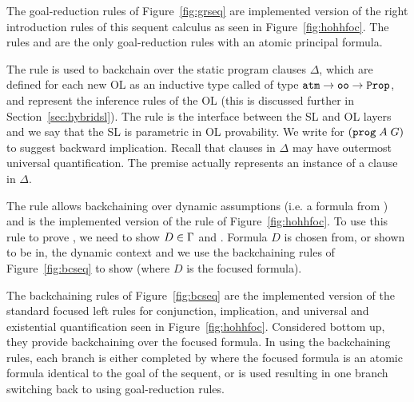 %
The goal-reduction rules of Figure~\ref{fig:grseq} are implemented version of the right introduction rules of this sequent calculus as seen in Figure~\ref{fig:hohhfoc}. The rules \rlnmsbc{} and \rlnmsinit{} are the only goal-reduction rules with an atomic principal formula.

The rule \rlnmsbc{} is used to backchain over the static program clauses $\Delta$, which are defined for each new OL as an inductive type called  of type $\texttt{atm} \rightarrow \texttt{oo} \rightarrow \texttt{Prop}$, and represent the inference rules of the OL (this is discussed further in Section~\ref{sec:hybridsl}). The rule \rlnmsbc{} is the interface between the SL and OL layers and we say that the SL is parametric in OL provability. We write  for $(\texttt{prog} \; A \; G)$ to suggest backward implication. Recall that clauses in $\Delta$ may have outermost universal quantification. The premise  actually represents an instance of a clause in $\Delta$.

The rule \rlnmsinit{} allows backchaining over dynamic assumptions (i.e. a formula from \dyncon{}) and is the implemented version of the  rule of Figure~\ref{fig:hohhfoc}. To use this rule to prove , we need to show $D \in \Gamma{}$ and . Formula $D$ is chosen from, or shown to be in, the dynamic context \dyncon{} and we use the backchaining rules of Figure~\ref{fig:bcseq} to show  (where $D$ is the focused formula).

The backchaining rules of Figure~\ref{fig:bcseq} are the implemented version of the standard focused left rules for conjunction, implication, and universal and existential quantification seen in Figure~\ref{fig:hohhfoc}. Considered bottom up, they provide backchaining over the focused formula. In using the backchaining rules, each branch is either completed by \rlnmbmatch{} where the focused formula is an atomic formula identical to the goal of the sequent, or \rlnmbimp{} is used resulting in one branch switching back to using goal-reduction rules.



